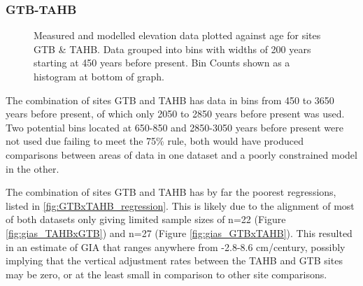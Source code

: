 \subsubsection{GTB-TAHB}

\begin{figure}[H]
	\caption{Measured and modelled elevation data plotted against age for sites GTB \& TAHB. Data grouped into bins with widths of 200 years starting at 450 years before present. Bin Counts shown as a histogram at bottom of graph.}	
	\label{fig:data_GTBxTAHB}
\end{figure}
The combination of sites GTB and TAHB has data in bins from 450 to 3650 years before
present, of which only 2050 to 2850 years before present was used. Two
potential bins located at 650-850 and 2850-3050 years before present were not used due failing to
meet the 75\% rule, both would have produced comparisons between areas of
data in one dataset and a poorly constrained model in the other.

The combination of sites GTB and TAHB has by far the poorest regressions, listed
in \ref{fig:GTBxTAHB_regression}. This is likely due to the alignment of most
of both datasets only giving limited sample sizes of n=22 (Figure \ref{fig:gias_TAHBxGTB})
and n=27 (Figure \ref{fig:gias_GTBxTAHB}). 
This resulted in an estimate of GIA that ranges anywhere from -2.8-8.6 cm/century,
possibly implying that the vertical adjustment rates
between the TAHB and GTB sites may be zero, or at the least small in comparison to
other site comparisons. \\

